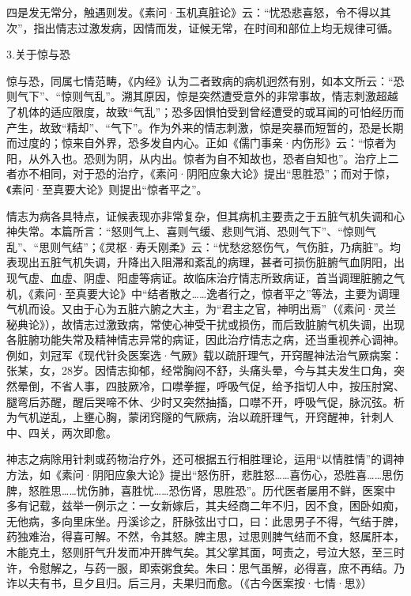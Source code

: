 \documentclass[draft,12pt]{ctexbook}
\begin{document}
四是发无常分，触遇则发。《素问·玉机真脏论》云：“忧恐悲喜怒，令不得以其次”，指出情志过激发病，因情而发，证候无常，在时间和部位上均无规律可循。

3.关于惊与恐

惊与恐，同属七情范畴，《内经》认为二者致病的病机迥然有别，如本文所云：“恐则气下”、“惊则气乱”。溯其原因，惊是突然遭受意外的非常事故，情志刺激超越了机体的适应限度，故致“气乱”；恐多因惧怕受到曾经遭受的或耳闻的可怕经历而产生，故致“精却”、“气下”。作为外来的情志刺激，惊是突暴而短暂的，恐是长期而过度的；惊来自外界，恐多发自内心。正如《儒门事亲·内伤形》云：“惊者为阳，从外入也。恐则为阴，从内出。惊者为自不知故也，恐者自知也”。治疗上二者亦不相同，对于恐的治疗，《素问·阴阳应象大论》提出“思胜恐”；而对于惊，《素问·至真要大论》则提出“惊者平之”。



情志为病各具特点，证候表现亦非常复杂，但其病机主要责之于五脏气机失调和心神失常。本篇所言：“怒则气上、喜则气缓、悲则气消、恐则气下”、“惊则气乱”、“思则气结”；《灵枢·寿夭刚柔》云：“忧愁忿怒伤气，气伤脏，乃病脏”。均表现出五脏气机失调，升降出入阻滞和紊乱的病理，甚者可损伤脏腑气血阴阳，出现气虚、血虚、阴虚、阳虚等病证。故临床治疗情志所致病证，首当调理脏腑之气机，《素问·至真要大论》中“结者散之……逸者行之，惊者平之”等法，主要为调理气机而设。又由于心为五脏六腑之大主，为“君主之官，神明出焉”（《素问·灵兰秘典论》），故情志过激致病，常使心神受干扰或损伤，而后致脏腑气机失调，出现各脏腑功能失常及精神情志异常的病证，因此治疗情志之病，还当重视养心调神。例如，刘冠军《现代针灸医案选·气厥》载以疏肝理气，开窍醒神法治气厥病案：张某，女，28岁。因情志抑郁，经常胸闷不舒，头痛头晕，今与其夫发生口角，突然晕倒，不省人事，四肢厥冷，口噤拳握，呼吸气促，给予指切人中，按压肘窝、腿弯后苏醒，醒后哭啼不休、少时又突然抽搐，口噤不开，呼吸气促，脉沉弦。析为气机逆乱，上壅心胸，蒙闭窍隧的气厥病，治以疏肝理气，开窍醒神，针刺人中、四关，两次即愈。

神志之病除用针刺或药物治疗外，还可根据五行相胜理论，运用“以情胜情”的调神方法，如《素问·阴阳应象大论》提出“怒伤肝，悲胜怒……喜伤心，恐胜喜……思伤脾，怒胜思……忧伤肺，喜胜忧……恐伤肾，思胜恐”。历代医者屡用不鲜，医案中多有记载，兹举一例示之：一女新嫁后，其夫经商二年不归，因不食，困卧如痴，无他病，多向里床坐。丹溪诊之，肝脉弦出寸口，曰：此思男子不得，气结于脾，药独难治，得喜可解。不然，令其怒。脾主思，过思则脾气结而不食，怒属肝本，木能克土，怒则肝气升发而冲开脾气矣。其父掌其面，呵责之，号泣大怒，至三时许，令慰解之，与药一服，即索粥食矣。朱曰：思气虽解，必得喜，庶不再结。乃诈以夫有书，旦夕且归。后三月，夫果归而愈。（《古今医案按·七情·思》）
\end{document}
